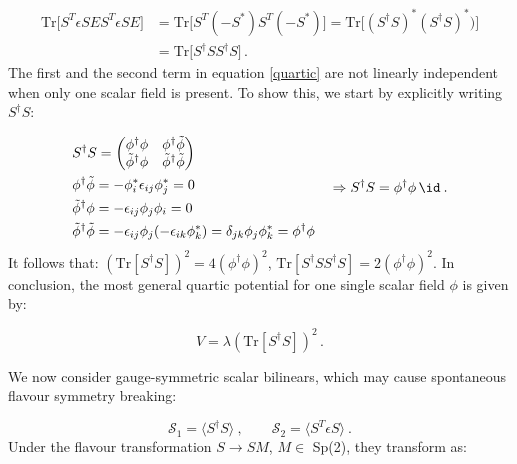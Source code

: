 \begin{equation}
\begin{split}
\mathrm{Tr} \bigl[ S^T \epsilon S E S^T \epsilon S E\bigr]  & = \mathrm{Tr} \bigl[ S^T (-S^*) S^T (-S^*) \bigr] = \mathrm{Tr} \bigl[ (S^{\dagger} S)^* (S^{\dagger} S)^*) \bigr] \\
& =\mathrm{Tr} \bigl[ S^{\dagger} S S^{\dagger} S\bigr] \, .
\end{split}
\label{proof2}
\end{equation}
%
The first and the second term in equation \ref{quartic} are not linearly independent when only one scalar field is present. To show this, we start by explicitly writing $S^{\dagger} S$:

\begin{equation}
\begin{split}
& S^{\dagger} S = 
\begin{pmatrix}
\phi^{\dagger}\phi  & \phi^{\dagger} \tilde{\phi} \\
\tilde{\phi}^{\dagger} \phi & \tilde{\phi}^{\dagger} \tilde{\phi} \\
\end{pmatrix} \\
& \phi^{\dagger} \tilde{\phi} = - \phi^*_i \epsilon_{ij} \phi^*_j = 0 \\
& \tilde{\phi}^{\dagger} \phi = - \epsilon_{ij} \phi_j\phi_i = 0 \\
& \tilde{\phi}^{\dagger} \tilde{\phi} = - \epsilon_{ij} \phi_j (- \epsilon_{ik} \phi^*_k) = \delta_{jk} \phi_j \phi^*_k = \phi^{\dagger} \phi \\
\end{split}
\quad \Rightarrow  S^{\dagger} S = \phi^{\dagger} \phi \, \id \: .
\label{app_S1}
\end{equation}
%
It follows that: $(\mathrm{Tr} [S^{\dagger} S])^2 = 4 (\phi^{\dagger} \phi)^2$, $\mathrm{Tr}[S^{\dagger} S S^{\dagger} S]= 2 (\phi^{\dagger} \phi)^2$.
In conclusion, the most general quartic potential for one single scalar field $\phi$ is given by:

\begin{equation}
V = \lambda (\mathrm{Tr} [S^{\dagger} S])^2  \, .
\end{equation}

We now consider gauge-symmetric scalar bilinears, which may cause spontaneous flavour symmetry breaking:

\begin{equation}
\mathcal{S}_1 = \langle S^{\dagger} S \rangle \: , \qquad \mathcal{S}_2 = \langle S^T \epsilon S \rangle \: .
\end{equation}
%
Under the flavour transformation $S \to SM$, $M \in$ Sp(2), they transform as:

